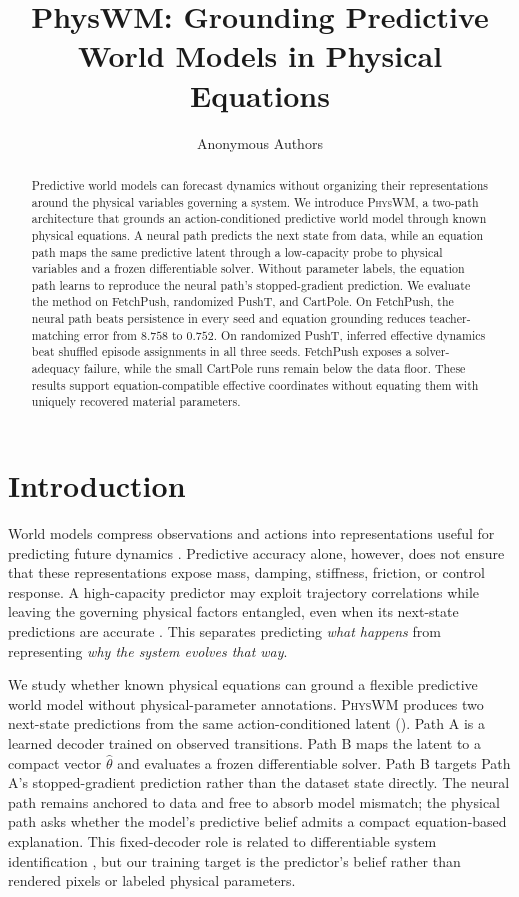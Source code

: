\documentclass{article}
\title{PhysWM: Grounding Predictive World Models in Physical Equations}
\author{Anonymous Authors}
\newcommand{\model}{\textsc{PhysWM}\xspace}
\begin{document}
\maketitle

\begin{abstract}
Predictive world models can forecast dynamics without organizing their representations around the physical variables governing a system. We introduce \model, a two-path architecture that grounds an action-conditioned predictive world model through known physical equations. A neural path predicts the next state from data, while an equation path maps the same predictive latent through a low-capacity probe to physical variables and a frozen differentiable solver. Without parameter labels, the equation path learns to reproduce the neural path's stopped-gradient prediction. We evaluate the method on FetchPush, randomized PushT, and CartPole. On FetchPush, the neural path beats persistence in every seed and equation grounding reduces teacher-matching error from $8.758$ to $0.752$. On randomized PushT, inferred effective dynamics beat shuffled episode assignments in all three seeds. FetchPush exposes a solver-adequacy failure, while the small CartPole runs remain below the data floor. These results support equation-compatible effective coordinates without equating them with uniquely recovered material parameters.
\end{abstract}

\section{Introduction}

World models compress observations and actions into representations useful for predicting future dynamics \citep{ha2018worldmodels,hafner2020dreamer,hafner2023dreamerv3,zhou2024dinowm}. Predictive accuracy alone, however, does not ensure that these representations expose mass, damping, stiffness, friction, or control response. A high-capacity predictor may exploit trajectory correlations while leaving the governing physical factors entangled, even when its next-state predictions are accurate \citep{mao2024piwm}. This separates predicting \emph{what happens} from representing \emph{why the system evolves that way}.

We study whether known physical equations can ground a flexible predictive world model without physical-parameter annotations. \model produces two next-state predictions from the same action-conditioned latent (). Path A is a learned decoder trained on observed transitions. Path B maps the latent to a compact vector $\hat\theta$ and evaluates a frozen differentiable solver. Path B targets Path A's stopped-gradient prediction rather than the dataset state directly. The neural path remains anchored to data and free to absorb model mismatch; the physical path asks whether the model's predictive belief admits a compact equation-based explanation. This fixed-decoder role is related to differentiable system identification \citep{jatavallabhula2021gradsim}, but our training target is the predictor's belief rather than rendered pixels or labeled physical parameters.
\end{document}
